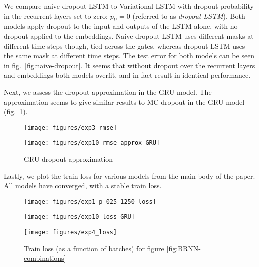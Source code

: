 \documentclass{article}
\theoremstyle{definition}
\begin{document}
We compare naive dropout LSTM to Variational LSTM with dropout probability in the recurrent layers set to zero: $p_U=0$ (referred to as \textit{dropout LSTM}). Both models apply dropout to the input and outputs of the LSTM alone, with no dropout applied to the embeddings. Naive dropout LSTM uses different masks at different time steps though, tied across the gates, whereas dropout LSTM uses the same mask at different time steps. 
The test error for both models can be seen in fig.\ \ref{fig:naive-dropout}.
It seems that without dropout over the recurrent layers  and embeddings both models overfit, and in fact result in identical performance.

Next, we assess the dropout approximation in the GRU model. The approximation seems to give similar results to MC dropout in the GRU model (fig.\ \ref{fig:exp10_rmse_approx_GRU}). 

\begin{figure}[h!]
\center
\begin{minipage}{0.49\linewidth}
\texttt{[image: figures/exp3\_rmse]}
\caption{\textit{Naive dropout LSTM} uses different dropout masks at each time step, whereas \textit{Dropout LSTM} uses the same mask at each time step. Both models apply dropout to the inputs and outputs alone, and result in identical performance.}
\label{fig:naive-dropout}
\end{minipage}
\begin{minipage}{0.49\linewidth}
\texttt{[image: figures/exp10\_rmse\_approx\_GRU]}
\caption{GRU dropout approximation}
\label{fig:exp10_rmse_approx_GRU}
\end{minipage}
\end{figure}

Lastly, we plot the train loss for various models from the main body of the paper. All models have converged, with a stable train loss.

\begin{figure}[h!]
\center
\begin{minipage}{0.32\linewidth}
\texttt{[image: figures/exp1\_p\_025\_1250\_loss]}
\caption{Train loss (as a function of batches) for figure \ref{fig:BLSTM-a}}
\end{minipage}
\begin{minipage}{0.32\linewidth}
\texttt{[image: figures/exp10\_loss\_GRU]}
\caption{\label{fig:BGRU-a}GRU train loss (as a function of batches) (figure \ref{fig:BGRU-a})}
\end{minipage}
\begin{minipage}{0.32\linewidth}
\texttt{[image: figures/exp4\_loss]}
\caption{Train loss (as a function of batches) for figure \ref{fig:BRNN-combinations}}
\end{minipage}
\end{figure}
\end{document}
